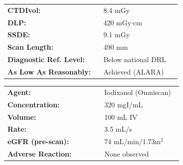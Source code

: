 \documentclass[11pt,a4paper]{article}
\begin{document}
\noindent
\begin{minipage}[t]{0.48\linewidth}
\begin{tcolorbox}[radbox, title={\faLock\hspace{4pt}Radiation Dose Record}]
\vspace{4pt}
\small
\begin{tabular}{@{}p{0.52\linewidth}p{0.42\linewidth}@{}}
  \textbf{CTDIvol:} & 8.4 mGy \\[3pt]
  \textbf{DLP:} & 420 mGy$\cdot$cm \\[3pt]
  \textbf{SSDE:} & 9.1 mGy \\[3pt]
  \textbf{Scan Length:} & 490 mm \\[3pt]
  \textbf{Diagnostic Ref. Level:} & Below national DRL \\[3pt]
  \textbf{As Low As Reasonably:} & Achieved (ALARA) \\
\end{tabular}
\vspace{4pt}
\end{tcolorbox}
\end{minipage}%
\hfill
\par
\begin{minipage}[t]{0.48\linewidth}
\begin{tcolorbox}[radbox, title={\faVial\hspace{4pt}Contrast Administration Record}]
\vspace{4pt}
\small
\begin{tabular}{@{}p{0.52\linewidth}p{0.42\linewidth}@{}}
  \textbf{Agent:} & Iodixanol (Omniscan) \\[3pt]
  \textbf{Concentration:} & 320 mgI/mL \\[3pt]
  \textbf{Volume:} & 100 mL IV \\[3pt]
  \textbf{Rate:} & 3.5 mL/s \\[3pt]
  \textbf{eGFR (pre-scan):} & 74 mL/min/1.73m$^{2}$ \\[3pt]
  \textbf{Adverse Reaction:} & None observed \\
\end{tabular}
\vspace{4pt}
\end{tcolorbox}
\end{minipage}

\vspace{8pt}
\end{document}
